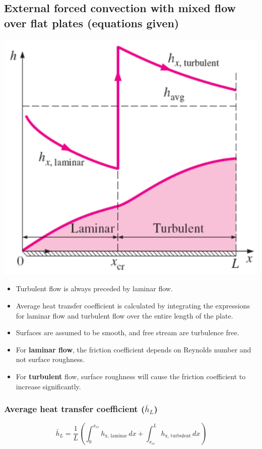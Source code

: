 \documentclass[11pt]{article}
\begin{document}
\subsection{External forced convection with mixed flow over flat plates (equations given)}
\label{sec:org73ccff6}
\begin{center}
\includegraphics[width=.9\linewidth]{./images/external-forced-convection-with-mixed-flow-over-flat-plate.png}
\end{center}
\begin{itemize}
\item Turbulent flow is always preceded by laminar flow.
\item Average heat transfer coefficient is calculated by integrating the expressions for laminar flow and turbulent flow over the entire length of the plate.
\item Surfaces are assumed to be smooth, and free stream are turbulence free.
\item For \textbf{laminar flow}, the friction coefficient depends on Reynolds number and not surface roughness.
\item For \textbf{turbulent} flow, surface roughness will cause the friction coefficient to increase significantly.
\end{itemize}

\subsubsection{Average heat transfer coefficient (\(\bar{h}_L\))}
\label{sec:orgd50e072}
\[\bar{h}_L = \frac{1}{L} \left(\int_0^{x_{cr}} h_{\text{x, laminar}} \, dx + \int_{x_{cr}}^L h_{\text{x, turbulent}} \, dx \right)\]
\end{document}
